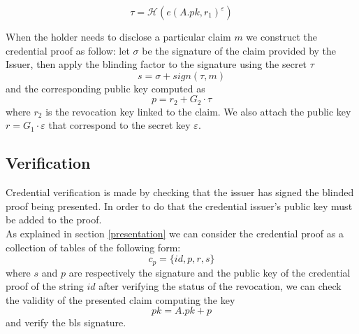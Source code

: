\documentclass[conference]{IEEEtran}
\begin{document}
\begin{equation}\label{tau_f}
    \tau = \mathcal{H}(e(A.pk, r_1)^{\varepsilon})
\end{equation}

When the holder needs to disclose a particular claim $m$ we construct the credential proof as follow:
let $\sigma$ be the signature of the claim provided by the Issuer, then apply the blinding factor to the signature using the secret $\tau$
\begin{equation}\label{claim.s}
    s = \sigma + sign(\tau, m)
\end{equation}
and the corresponding public key computed as
\begin{equation*}
    p = r_2 + G_2 \cdot \tau
\end{equation*}
where $r_2$ is the revocation key linked to the claim.
We also attach the public key $r = G_1 \cdot \varepsilon$ that correspond to the secret key $\varepsilon$.

\subsection{Verification}

Credential verification is made by checking that the issuer has signed the blinded proof being presented. In order to do that the credential issuer's public key must be added to the proof.\\
As explained in section \ref{presentation} we can consider the credential proof as a collection of tables of the following form:
\begin{equation*}
    c_p = \{id, p, r, s \}
\end{equation*}
where $s$ and $p$ are respectively the signature and the public key of the credential proof of the string $id$
after verifying the status of the revocation, we can check the validity of the presented claim computing the key
\begin{equation*}
    pk = A.pk + p
\end{equation*}
and verify the bls signature.
\end{document}
